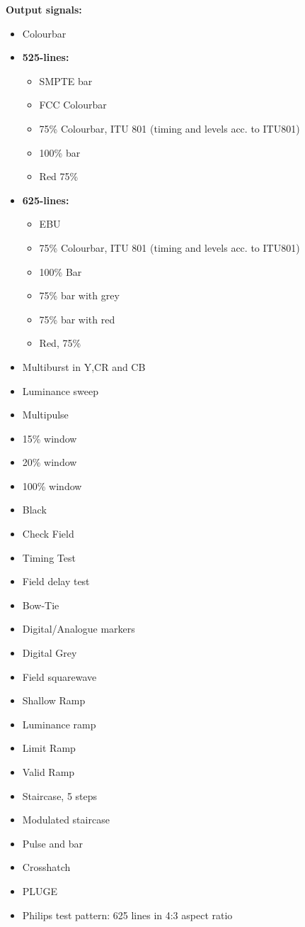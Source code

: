 \textbf{Output signals:}
\begin{itemize}

\setlength{\itemsep}{1pt}
\setlength{\parskip}{0pt}

\item Colourbar
\item \textbf{525-lines:}
\begin{itemize}
\item SMPTE bar
\item FCC Colourbar
\item 75\% Colourbar, ITU 801 (timing and levels acc. to ITU801)
\item 100\% bar
\item Red 75\%
\end{itemize}
\item \textbf{625-lines:}
\begin{itemize}
\item EBU
\item 75\% Colourbar, ITU 801 (timing and levels acc. to ITU801)
\item 100\% Bar
\item 75\% bar with grey
\item 75\% bar with red
\item Red, 75\%
\end{itemize}

\item Multiburst in Y,CR and CB
\item Luminance sweep
\item Multipulse
\item 15\% window
\item 20\% window
\item 100\% window
\item Black
\item Check Field
\item Timing Test
\item Field delay test
\item Bow-Tie
\item Digital/Analogue markers
\item Digital Grey
\item Field squarewave
\item Shallow Ramp
\item Luminance ramp
\item Limit Ramp
\item Valid Ramp
\item Staircase, 5 steps
\item Modulated staircase
\item Pulse and bar
\item Crosshatch
\item PLUGE
\item Philips test pattern: 625 lines in 4:3 aspect ratio

\end{itemize}


